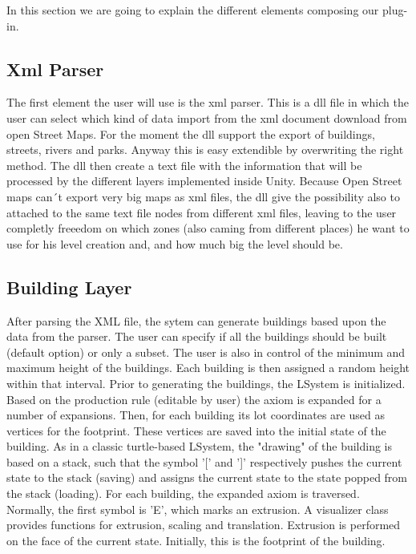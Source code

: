\documentclass[conference]{IEEEtran}
\begin{document}
In this section we are going to explain the different elements composing our plug-in. 

\subsection{Xml Parser}

The first element the user will use is the xml parser. This is a dll file in which the user can select which kind of data import from the xml document download from open Street Maps. For the moment the dll support the export of buildings, streets, rivers and parks. Anyway this is easy extendible by overwriting the right method.  The dll then create a text file with the information that will be processed by the different layers implemented inside Unity. Because Open Street maps can´t export very big maps as xml files, the dll give the possibility also to attached to the same text file nodes from different xml files, leaving to the user completly freeedom on which zones (also caming from different places) he want to use for his level creation and, and how much big the level should be. 

\subsection{Building Layer}
After parsing the XML file, the sytem can generate buildings based upon the data from the parser. The user can specify if all the buildings should be built (default option) or only a subset. The user is also in control of the minimum and maximum height of the buildings. Each building is then assigned a random height within that interval. Prior to generating the buildings, the LSystem is initialized. Based on the production rule (editable by user) the axiom is expanded for a number of expansions. Then, for each building its lot coordinates are used as vertices for the footprint. These vertices are saved into the initial state of the building. As in a classic turtle-based LSystem, the "drawing" of the building is based on a stack, such that the symbol '[' and ']' respectively pushes the current state to the stack (saving) and assigns the current state to the state popped from the stack (loading). For each building, the expanded axiom is traversed. Normally, the first symbol is 'E', which marks an extrusion. A visualizer class provides functions for extrusion, scaling and translation. Extrusion is performed on the face of the current state. Initially, this is the footprint of the building.
\end{document}
